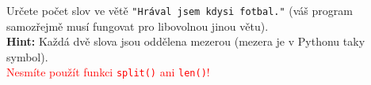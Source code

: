 \question[50]
Určete počet slov ve větě \texttt{"Hrával jsem kdysi fotbal."} (váš program
samozřejmě musí fungovat pro libovolnou jinou větu).\\
\textbf{Hint:} Každá dvě slova jsou oddělena mezerou (mezera je v Pythonu taky
symbol).\\
\textcolor{red}{Nesmíte použít funkci \texttt{split()} ani \texttt{len()}!}